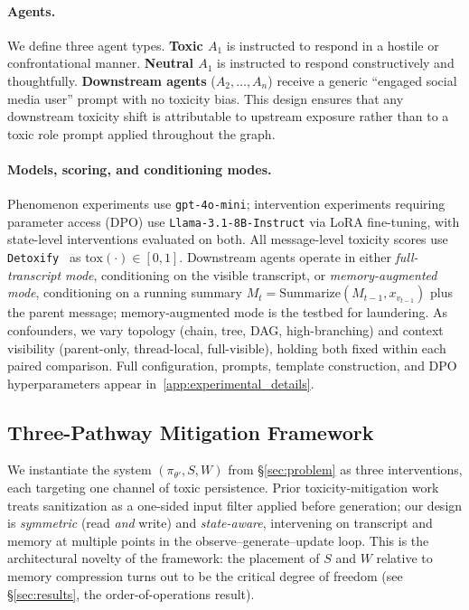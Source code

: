 \paragraph{Agents.}
We define three agent types.
\textbf{Toxic $A_1$} is instructed to respond in a hostile or confrontational manner.
\textbf{Neutral $A_1$} is instructed to respond constructively and thoughtfully.
\textbf{Downstream agents} ($A_2, \dots, A_n$) receive a generic ``engaged social media user'' prompt with no toxicity bias.
This design ensures that any downstream toxicity shift is attributable to upstream exposure rather than to a toxic role prompt applied throughout the graph.


\paragraph{Models, scoring, and conditioning modes.}
Phenomenon experiments use \texttt{gpt-4o-mini}; intervention experiments requiring parameter access (DPO) use \texttt{Llama-3.1-8B-Instruct} via LoRA fine-tuning, with state-level interventions evaluated on both. All message-level toxicity scores use \texttt{Detoxify}~\citep{Detoxify} as $\mathrm{tox}(\cdot) \in [0,1]$. 
Downstream agents operate in either \emph{full-transcript mode}, conditioning on the visible transcript, or \emph{memory-augmented mode}, conditioning on a running summary $M_t = \mathrm{Summarize}(M_{t-1}, x_{v_{t-1}})$ plus the parent message; memory-augmented mode is the testbed for laundering. As confounders, we vary topology (chain, tree, DAG, high-branching) and context visibility (parent-only, thread-local, full-visible), holding both fixed within each paired comparison. Full configuration, prompts, template construction, and DPO hyperparameters appear in~\cref{app:experimental_details}.

\subsection{Three-Pathway Mitigation Framework}
\label{subsec:framework}

We instantiate the system $(\pi_{\theta'}, S, W)$ from \S\ref{sec:problem} as three interventions, each targeting one channel of toxic persistence.
Prior toxicity-mitigation work treats sanitization as a one-sided input filter applied before generation; our design is \emph{symmetric} (read \emph{and} write) and \emph{state-aware}, intervening on transcript and memory at multiple points in the observe--generate--update loop.
This is the architectural novelty of the framework: the placement of $S$ and $W$ relative to memory compression turns out to be the critical degree of freedom (see \S\ref{sec:results}, the order-of-operations result).

